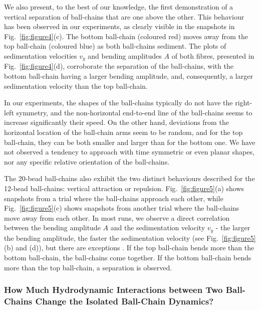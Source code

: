 \documentclass{article}
\begin{document}
We also present, to the best of our knowledge, the first demonstration of a vertical separation of ball-chains that are one above the other. %
This behaviour has been observed in our experiments, as clearly visible in the snapshots in Fig.~\ref{fig:figure4}(c). The bottom ball-chain (coloured red) moves away from the top ball-chain (coloured blue) as both ball-chains sediment. %
The plots of sedimentation velocities $v_y$ and bending amplitudes $A$ of both fibres, presented in Fig.~\ref{fig:figure4}(d), corroborate the separation of the ball-chains, with the bottom ball-chain having a larger bending amplitude, and, consequently, a larger sedimentation velocity than the top ball-chain. 

In our experiments, the shapes of the ball-chains typically do not have the right-left symmetry, and the non-horizontal end-to-end line of the ball-chains seems to increase significantly their speed. On the other hand, deviations from the horizontal location of the ball-chain arms seem to be random, and for the top ball-chain, they can be both smaller and larger than for the bottom one. We have not observed a tendency to approach with time symmetric or even planar shapes, nor any specific relative orientation of the ball-chains. 

The 20-bead ball-chains also exhibit the two distinct behaviours described for the 12-bead ball-chains: vertical attraction or repulsion. %
Fig.~\ref{fig:figure5}(a) shows snapshots from a trial where %
the ball-chains approach each other, while Fig.~\ref{fig:figure5}(c) shows snapshots from another trial where the ball-chains move away from each other. In most runs, we observe a direct correlation between the bending amplitude $A$ and the sedimentation velocity $v_y$ - the larger the bending amplitude, the faster %
the sedimentation velocity (see %
Fig.~\ref{fig:figure5}(b) and (d)), but there are exceptions%
. %
If the top ball-chain bends more than the bottom ball-chain, the ball-chains come together. If the bottom ball-chain bends more than the top ball-chain, a separation is observed. 

\subsubsection{How Much Hydrodynamic Interactions between Two Ball-Chains Change the Isolated Ball-Chain Dynamics?}
\end{document}
